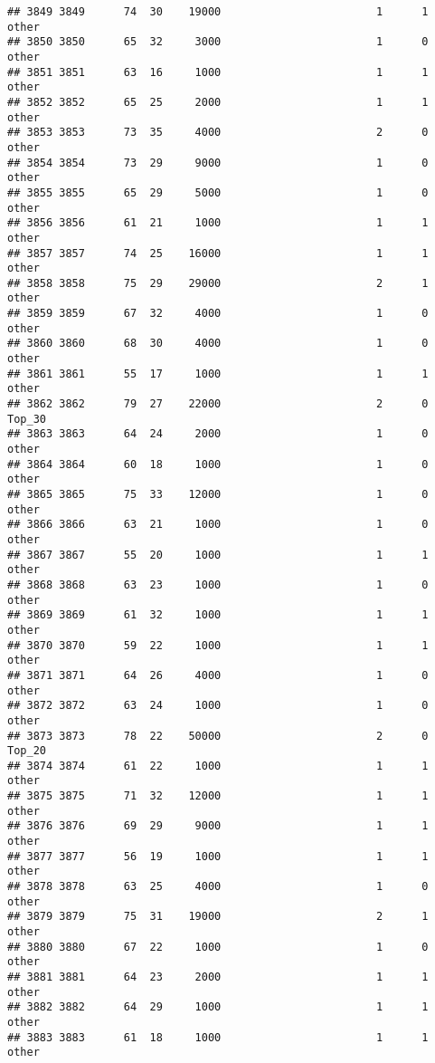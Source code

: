 \documentclass[
]{article}
\begin{document}
\begin{verbatim}
## 3849 3849      74  30    19000                        1      1    other
## 3850 3850      65  32     3000                        1      0    other
## 3851 3851      63  16     1000                        1      1    other
## 3852 3852      65  25     2000                        1      1    other
## 3853 3853      73  35     4000                        2      0    other
## 3854 3854      73  29     9000                        1      0    other
## 3855 3855      65  29     5000                        1      0    other
## 3856 3856      61  21     1000                        1      1    other
## 3857 3857      74  25    16000                        1      1    other
## 3858 3858      75  29    29000                        2      1    other
## 3859 3859      67  32     4000                        1      0    other
## 3860 3860      68  30     4000                        1      0    other
## 3861 3861      55  17     1000                        1      1    other
## 3862 3862      79  27    22000                        2      0   Top_30
## 3863 3863      64  24     2000                        1      0    other
## 3864 3864      60  18     1000                        1      0    other
## 3865 3865      75  33    12000                        1      0    other
## 3866 3866      63  21     1000                        1      0    other
## 3867 3867      55  20     1000                        1      1    other
## 3868 3868      63  23     1000                        1      0    other
## 3869 3869      61  32     1000                        1      1    other
## 3870 3870      59  22     1000                        1      1    other
## 3871 3871      64  26     4000                        1      0    other
## 3872 3872      63  24     1000                        1      0    other
## 3873 3873      78  22    50000                        2      0   Top_20
## 3874 3874      61  22     1000                        1      1    other
## 3875 3875      71  32    12000                        1      1    other
## 3876 3876      69  29     9000                        1      1    other
## 3877 3877      56  19     1000                        1      1    other
## 3878 3878      63  25     4000                        1      0    other
## 3879 3879      75  31    19000                        2      1    other
## 3880 3880      67  22     1000                        1      0    other
## 3881 3881      64  23     2000                        1      1    other
## 3882 3882      64  29     1000                        1      1    other
## 3883 3883      61  18     1000                        1      1    other

\end{verbatim}
\end{document}

